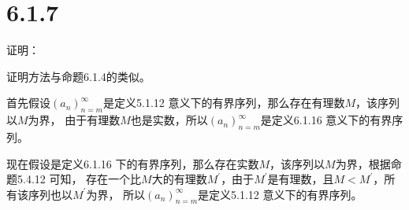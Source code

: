 \documentclass{article}
\theoremstyle{mystyle}
\begin{document}
\section*{6.1.7}

证明：

证明方法与命题6.1.4的类似。

首先假设$(a_n)_{n=m}^\infty$是定义5.1.12 意义下的有界序列，那么存在有理数$M$，该序列以$M$为界，
由于有理数$M$也是实数，所以$(a_n)_{n=m}^\infty$是定义6.1.16 意义下的有界序列。

现在假设是定义6.1.16 下的有界序列，那么存在实数$M$，该序列以$M$为界，根据命题5.4.12 可知，
存在一个比$M$大的有理数$M^\prime$，由于$M^\prime$是有理数，且$M < M^\prime$，所有该序列也以$M^\prime$为界，
所以$(a_n)_{n=m}^\infty$是定义5.1.12 意义下的有界序列。
\end{document}
